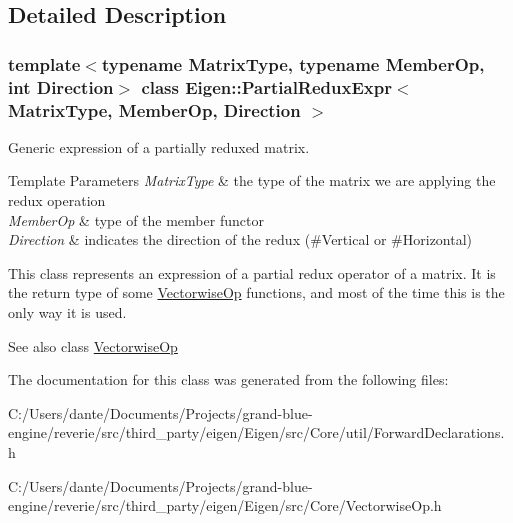 \subsection{Detailed Description}
\subsubsection*{template$<$typename Matrix\+Type, typename Member\+Op, int Direction$>$\newline
class Eigen\+::\+Partial\+Redux\+Expr$<$ Matrix\+Type, Member\+Op, Direction $>$}

Generic expression of a partially reduxed matrix. 


\begin{DoxyTemplParams}{Template Parameters}
{\em Matrix\+Type} & the type of the matrix we are applying the redux operation \\
\hline
{\em Member\+Op} & type of the member functor \\
\hline
{\em Direction} & indicates the direction of the redux (\#\+Vertical or \#\+Horizontal)\\
\hline
\end{DoxyTemplParams}
This class represents an expression of a partial redux operator of a matrix. It is the return type of some \mbox{\hyperlink{class_eigen_1_1_vectorwise_op}{Vectorwise\+Op}} functions, and most of the time this is the only way it is used.

\begin{DoxySeeAlso}{See also}
class \mbox{\hyperlink{class_eigen_1_1_vectorwise_op}{Vectorwise\+Op}} 
\end{DoxySeeAlso}


The documentation for this class was generated from the following files\+:\begin{DoxyCompactItemize}
\item 
C\+:/\+Users/dante/\+Documents/\+Projects/grand-\/blue-\/engine/reverie/src/third\+\_\+party/eigen/\+Eigen/src/\+Core/util/Forward\+Declarations.\+h\item 
C\+:/\+Users/dante/\+Documents/\+Projects/grand-\/blue-\/engine/reverie/src/third\+\_\+party/eigen/\+Eigen/src/\+Core/Vectorwise\+Op.\+h\end{DoxyCompactItemize}
